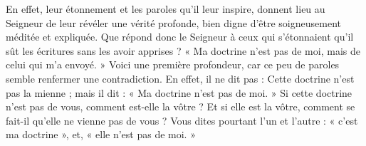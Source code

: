 En effet, leur étonnement et les paroles qu’il leur inspire, donnent lieu au Seigneur de leur révéler une vérité profonde, bien digne d’être soigneusement méditée et expliquée. Que répond donc le Seigneur à ceux qui s’étonnaient qu’il sût les écritures sans les avoir apprises ? « Ma doctrine n’est pas de moi, mais de celui qui m’a envoyé. » Voici une première profondeur, car ce peu de paroles semble renfermer une contradiction. En effet, il ne dit pas : Cette doctrine n’est pas la mienne ; mais il dit : « Ma doctrine n’est pas de moi. » Si cette doctrine n’est pas de vous, comment est-elle la vôtre ? Et si elle est la vôtre, comment se fait-il qu’elle ne vienne pas de vous ? Vous dites pourtant l’un et l’autre : « c’est ma doctrine », et, « elle n’est pas de moi. »
